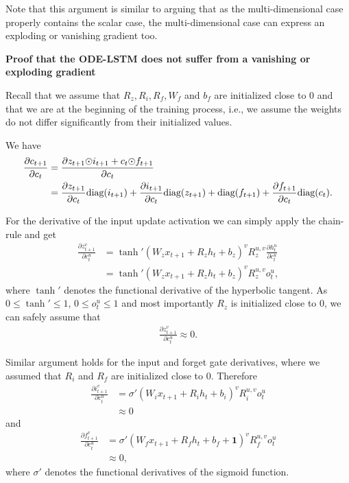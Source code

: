 \documentclass{article}
\begin{document}
Note that this argument is similar to arguing that as the multi-dimensional case properly contains the scalar case, the multi-dimensional case can express an exploding or vanishing gradient too.

\textbf{Proof that the ODE-LSTM does not suffer from a vanishing or exploding gradient}


Recall that we assume that $R_z, R_i, R_f, W_f$ and $b_f$ are initialized close to 0 and that we are at the beginning of the training process, i.e., we assume the weights do not differ significantly from their initialized values.

We have
\begin{align*}
\frac{\partial c_{t+1}}{\partial c_t} &= \frac{\partial z_{t+1} \elmentwisemul i_{t+1} + c_{t}\elmentwisemul f_{t+1}}{\partial c_t} \\
&= \frac{\partial z_{t+1}}{\partial c_t}  \text{diag}(i_{t+1}) +  \frac{\partial  i_{t+1}}{\partial c_t}  \text{diag}(z_{t+1}) + \text{diag}(f_{t+1}) +  \frac{\partial  f_{t+1}}{\partial c_t} \text{diag}(c_t).
\end{align*}



For the derivative of the input update activation we can simply apply the chain-rule and get
\begin{align*}
    \frac{\partial z_{t+1}^v}{\partial c_t^u} &= \tanh'(W_z x_{t+1} + R_z h_{t} + b_z)^v R_z^{u,v} \frac{\partial h_t^u}{\partial c_t^u}\\
     &= \tanh'(W_z x_{t+1} + R_z h_{t} + b_z)^v R_z^{u,v} o_t^u,
\end{align*}
where $\tanh'$ denotes the functional derivative of the hyperbolic tangent.
As $0 \leq \tanh' \leq 1$,  $0 \leq o_t^u \leq 1$ and most importantly $R_z$ is initialized close to 0, we can safely assume that
\begin{align*}
 \frac{\partial z_{t+1}^v}{\partial c_t^u}  \approx 0.
\end{align*}

Similar argument holds for the input and forget gate derivatives, where we assumed that $R_i$ and $R_f$ are initialized close to 0. Therefore
\begin{align*}
    \frac{\partial i_{t+1}^v}{\partial c_t^u} &= \sigma'(W_i x_{t+1} + R_i h_{t} + b_i)^v R_i^{u,v} o_t^u\\
    & \approx 0
\end{align*}
and
\begin{align*}
    \frac{\partial f_{t+1}^v}{\partial c_t^u} &= \sigma'(W_f x_{t+1} + R_f h_{t} + b_f + \mathbf{1})^v R_f^{u,v} o_t^{u}\\
    & \approx 0,
\end{align*}
where $\sigma'$ denotes the functional derivatives of the sigmoid function.
\end{document}
